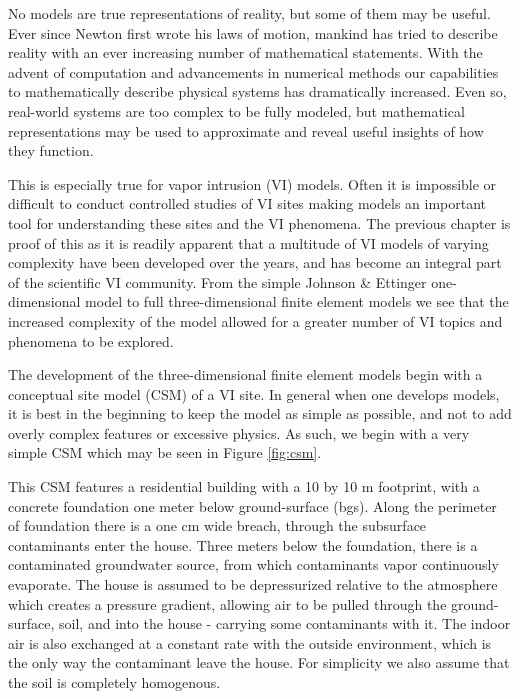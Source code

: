 No models are true representations of reality, but some of them may be useful.
Ever since Newton first wrote his laws of motion, mankind has tried to describe reality with an ever increasing number of mathematical statements.
With the advent of computation and advancements in numerical methods our capabilities to mathematically describe physical systems has dramatically increased.
Even so, real-world systems are too complex to be fully modeled, but mathematical representations may be used to approximate and reveal useful insights of how they function.\par

This is especially true for vapor intrusion (VI) models.
Often it is impossible or difficult to conduct controlled studies of VI sites making models an important tool for understanding these sites and the VI phenomena.
The previous chapter is proof of this as it is readily apparent that a multitude of VI models of varying complexity have been developed over the years, and has become an integral part of the scientific VI community.
From the simple Johnson \& Ettinger one-dimensional model to full three-dimensional finite element models we see that the increased complexity of the model allowed for a greater number of VI topics and phenomena to be explored.\par


The development of the three-dimensional finite element models begin with a conceptual site model (CSM) of a VI site.
In general when one develops models, it is best in the beginning to keep the model as simple as possible, and not to add overly complex features or excessive physics.
As such, we begin with a very simple CSM which may be seen in Figure \ref{fig:csm}.\par

This CSM features a residential building with a 10 by 10 m footprint, with a concrete foundation one meter below ground-surface (bgs).
Along the perimeter of foundation there is a one cm wide breach, through the subsurface contaminants enter the house.
Three meters below the foundation, there is a contaminated groundwater source, from which contaminants vapor continuously evaporate.
The house is assumed to be depressurized relative to the atmosphere which creates a pressure gradient, allowing air to be pulled through the ground-surface, soil, and into the house - carrying some contaminants with it.
The indoor air is also exchanged at a constant rate with the outside environment, which is the only way the contaminant leave the house.
For simplicity we also assume that the soil is completely homogenous.\par

